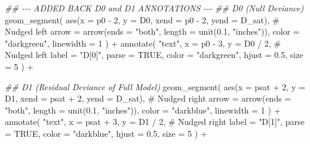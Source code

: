 \documentclass[
  letterpaper,
]{scrbook}
\newenvironment{Shaded}{\begin{snugshade}}{\end{snugshade}}
\newcommand{\AttributeTok}[1]{\textcolor[rgb]{0.40,0.45,0.13}{#1}}
\newcommand{\CommentTok}[1]{\textcolor[rgb]{0.37,0.37,0.37}{#1}}
\newcommand{\ConstantTok}[1]{\textcolor[rgb]{0.56,0.35,0.01}{#1}}
\newcommand{\DecValTok}[1]{\textcolor[rgb]{0.68,0.00,0.00}{#1}}
\newcommand{\DocumentationTok}[1]{\textcolor[rgb]{0.37,0.37,0.37}{\textit{#1}}}
\newcommand{\FloatTok}[1]{\textcolor[rgb]{0.68,0.00,0.00}{#1}}
\newcommand{\FunctionTok}[1]{\textcolor[rgb]{0.28,0.35,0.67}{#1}}
\newcommand{\NormalTok}[1]{\textcolor[rgb]{0.00,0.23,0.31}{#1}}
\newcommand{\SpecialCharTok}[1]{\textcolor[rgb]{0.37,0.37,0.37}{#1}}
\newcommand{\StringTok}[1]{\textcolor[rgb]{0.13,0.47,0.30}{#1}}
\begin{document}
\begin{Shaded}
\begin{Highlighting}[]
  \DocumentationTok{\#\# {-}{-}{-} ADDED BACK D0 and D1 ANNOTATIONS {-}{-}{-}}
  \DocumentationTok{\#\# D0 (Null Deviance)}
  \FunctionTok{geom\_segment}\NormalTok{(}
    \FunctionTok{aes}\NormalTok{(}\AttributeTok{x =}\NormalTok{ p0 }\SpecialCharTok{{-}} \DecValTok{2}\NormalTok{, }\AttributeTok{y =}\NormalTok{ D0, }\AttributeTok{xend =}\NormalTok{ p0 }\SpecialCharTok{{-}} \DecValTok{2}\NormalTok{, }\AttributeTok{yend =}\NormalTok{ D\_sat), }\CommentTok{\# Nudged left}
    \AttributeTok{arrow =} \FunctionTok{arrow}\NormalTok{(}\AttributeTok{ends =} \StringTok{"both"}\NormalTok{, }\AttributeTok{length =} \FunctionTok{unit}\NormalTok{(}\FloatTok{0.1}\NormalTok{, }\StringTok{"inches"}\NormalTok{)),}
    \AttributeTok{color =} \StringTok{"darkgreen"}\NormalTok{,}
    \AttributeTok{linewidth =} \DecValTok{1}
\NormalTok{  ) }\SpecialCharTok{+}
  \FunctionTok{annotate}\NormalTok{(}
    \StringTok{"text"}\NormalTok{,}
    \AttributeTok{x =}\NormalTok{ p0 }\SpecialCharTok{{-}} \DecValTok{3}\NormalTok{, }\AttributeTok{y =}\NormalTok{ D0 }\SpecialCharTok{/} \DecValTok{2}\NormalTok{, }\CommentTok{\# Nudged left}
    \AttributeTok{label =} \StringTok{"D[0]"}\NormalTok{, }\AttributeTok{parse =} \ConstantTok{TRUE}\NormalTok{,}
    \AttributeTok{color =} \StringTok{"darkgreen"}\NormalTok{, }\AttributeTok{hjust =} \FloatTok{0.5}\NormalTok{, }\AttributeTok{size =} \DecValTok{5}
\NormalTok{  ) }\SpecialCharTok{+}
  
  \DocumentationTok{\#\# D1 (Residual Deviance of Full Model)}
  \FunctionTok{geom\_segment}\NormalTok{(}
    \FunctionTok{aes}\NormalTok{(}\AttributeTok{x =}\NormalTok{ psat }\SpecialCharTok{+} \DecValTok{2}\NormalTok{, }\AttributeTok{y =}\NormalTok{ D1, }\AttributeTok{xend =}\NormalTok{ psat }\SpecialCharTok{+} \DecValTok{2}\NormalTok{, }\AttributeTok{yend =}\NormalTok{ D\_sat), }\CommentTok{\# Nudged right}
    \AttributeTok{arrow =} \FunctionTok{arrow}\NormalTok{(}\AttributeTok{ends =} \StringTok{"both"}\NormalTok{, }\AttributeTok{length =} \FunctionTok{unit}\NormalTok{(}\FloatTok{0.1}\NormalTok{, }\StringTok{"inches"}\NormalTok{)),}
    \AttributeTok{color =} \StringTok{"darkblue"}\NormalTok{,}
    \AttributeTok{linewidth =} \DecValTok{1}
\NormalTok{  ) }\SpecialCharTok{+}
  \FunctionTok{annotate}\NormalTok{(}
    \StringTok{"text"}\NormalTok{,}
    \AttributeTok{x =}\NormalTok{ psat }\SpecialCharTok{+} \DecValTok{3}\NormalTok{, }\AttributeTok{y =}\NormalTok{ D1 }\SpecialCharTok{/} \DecValTok{2}\NormalTok{, }\CommentTok{\# Nudged right}
    \AttributeTok{label =} \StringTok{"D[1]"}\NormalTok{, }\AttributeTok{parse =} \ConstantTok{TRUE}\NormalTok{,}
    \AttributeTok{color =} \StringTok{"darkblue"}\NormalTok{, }\AttributeTok{hjust =} \FloatTok{0.5}\NormalTok{, }\AttributeTok{size =} \DecValTok{5}
\NormalTok{  ) }\SpecialCharTok{+}
  

\end{Highlighting}
\end{Shaded}
\end{document}
